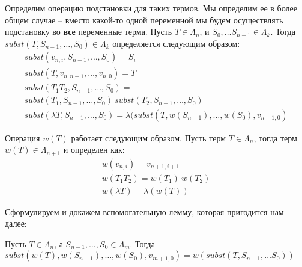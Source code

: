 Определим операцию подстановки для таких термов. Мы определим ее в более общем случае -- вместо какой-то одной переменной мы будем осуществлять подстановку во \textbf{все} переменные терма. Пусть $T \in \Lambda_{n}$, и $S_{0}, \dots S_{n-1} \in \Lambda_{k}$. Тогда $subst(T, S_{n - 1}, \dots, S_{0}) \in \Lambda_{k}$ определяется следующим образом:
\begin{gather*}
  subst(v_{n, i}, S_{n - 1}, \dots, S_{0}) = S_{i} \\
  subst(T, v_{n, n-1}, \dots, v_{n, 0}) = T \\
  subst(T_{1} T_{2}, S_{n - 1}, \dots, S_{0}) = \\
  subst(T_{1}, S_{n - 1}, \dots, S_{0})\ subst(T_{2}, S_{n - 1}, \dots, S_{0}) \\
  subst(\lambda T, S_{n - 1}, \dots, S_{0}) = \lambda (subst(T, w(S_{n - 1}), \dots, w(S_{0}), v_{n+1, 0})
\end{gather*}

Операция $w(T)$ работает следующим образом. Пусть терм $T \in \Lambda_{n}$, тогда терм $w(T) \in \Lambda_{n+1}$ и определен как:
\begin{gather*}
  w(v_{n, i}) = v_{n+1, i+1} \\
  w(T_{1} T_{2}) = w(T_1)\ w(T_2) \\
  w(\lambda T) = \lambda (w(T))
\end{gather*}

Сформулируем и докажем вспомогательную лемму, которая пригодится нам далее:
\begin{lemma}
  \label{index:weak_lemma}
  Пусть $T \in \Lambda_{n}$, а $S_{n-1}, \dots, S_{0} \in \Lambda_{m}$. Тогда $subst(w(T), w(S_{n-1}), \dots, w(S_{0}), v_{m+1, 0}) = w(subst(T, S_{n-1}, \dots S_{0}))$
\end{lemma}

